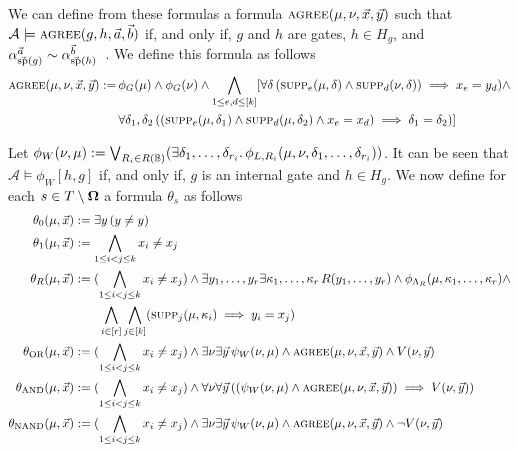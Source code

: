 \documentclass[../main/thesis.tex]{subfiles}
\begin{document}
We can define from these formulas a formula $\textsc{agree}(\mu, \nu, \vec{x},
\vec{y})$ such that $\mathcal{A} \models \textsc{agree}(g, h, \vec{a}, \vec{b})$ if,
and only if, $g$ and $h$ are gates, $h \in H_g$, and
$\alpha^{\vec{a}}_{\vec{\text{sp}}(g)} \sim \alpha^{\vec{b}}_{\vec{\text{sp}}(h)}$~\cite{AndersonD17}. We
define this formula as follows
\begin{align*}
  \textsc{agree} (\mu, \nu, \vec{x}, \vec{y}) := \, & \phi_G(\mu) \land \phi_G(\nu) \land \bigwedge_{1 \leq e , d \leq [k]} [\forall \delta \, (\textsc{supp}_e(\mu, \delta) \land \textsc{supp}_d (\nu, \delta)) \implies x_e = y_d) \land \\
                                                &\forall \delta_1, \delta_2\, ((\textsc{supp}_e (\mu, \delta_1) \land \textsc{supp}_d (\mu, \delta_2) \land x_e = x_d) \implies \delta_1 = \delta_2)]
\end{align*}

Let $\phi_W(\nu, \mu) := \bigvee_{R_i \in R(\mathbb{B})} (\exists \delta_1, \ldots,
\delta_{r_i}. \, \phi_{L, R_i}(\mu, \nu, \delta_1, \ldots, \delta_{r_i}))$. It
can be seen that $\mathcal{A} \models \phi_W [h, g]$ if, and only if, $g$ is an
internal gate and $h \in H_g$. We now define for each $s \in T \setminus \mathbf{\mathbf{\Omega}}$
a formula $\theta_s$ as follows
\begin{align*}
  \theta_0 (\mu, \vec{x}) &:= \exists y \, (y \neq y)\\
  \theta_1 (\mu, \vec{x}) &:= \bigwedge_{1 \leq i < j \leq k} x_i \neq x_j \\
  \theta_R (\mu, \vec{x}) &:= (\bigwedge_{1 \leq i < j \leq k} x_i \neq x_j) \land \exists y_1, \ldots, y_r \exists \kappa_1, \ldots, \kappa_r \, R(y_1, \ldots, y_r) \land  \phi_{\Lambda_R}(\mu, \kappa_1, \ldots, \kappa_{r}) \land \\ & \qquad {}   \bigwedge_{i \in [r]} \bigwedge_{j \in [k]} (\textsc{supp}_j (\mu, \kappa_i) \implies y_i = x_j)\\
  \theta_{\text{\upshape OR}} (\mu, \vec{x}) &:= (\bigwedge_{1 \leq i < j \leq k} x_i \neq x_j) \land \exists \nu \exists \vec{y}  \, \psi_{W} (\nu, \mu) \land \textsc{agree}(\mu, \nu, \vec{x}, \vec{y}) \land V(\nu, \vec{y})\\
  \theta_{\text{\upshape AND}} (\mu, \vec{x}) &:= (\bigwedge_{1 \leq i < j \leq k} x_i \neq x_j) \land \forall \nu \forall \vec{y} \, ((\psi_{W} (\nu, \mu) \land \textsc{agree}(\mu, \nu, \vec{x}, \vec{y})) \implies V(\nu, \vec{y}))\\
  \theta_{\text{\upshape NAND}} (\mu, \vec{x}) &:= (\bigwedge_{1 \leq i < j \leq k} x_i \neq x_j) \land \exists \nu \exists \vec{y}  \, \psi_{W} (\nu, \mu) \land \textsc{agree}(\mu, \nu, \vec{x}, \vec{y}) \land \neg V(\nu, \vec{y})
\end{align*}
\end{document}
